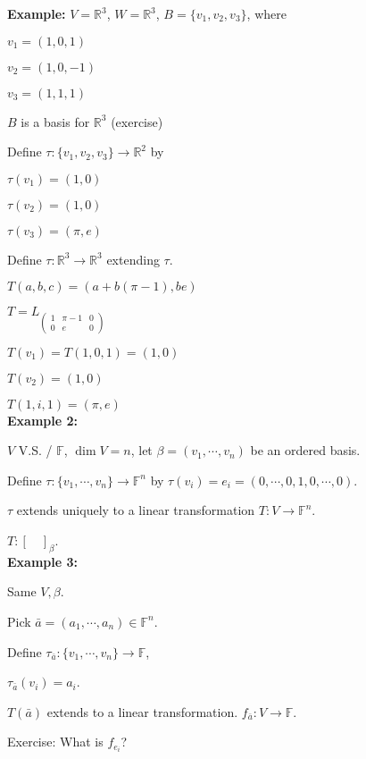 \documentclass[12pt]{article}
\newcommand{\mR}{{\mathbb{R}}}
\newcommand{\mF}{{\mathbb{F}}}
\begin{document}
	{\color{Brown}
	\textbf{Example: }
	$V = \mR^3$, $W = \mR^3$, $B = \{v_1, v_2, v_3\}$, where 
	\begin{description}
		\item $v_1 = (1, 0, 1)$
		\item $v_2 = (1, 0, -1)$
		\item $v_3 = (1, 1, 1)$
	\end{description}

	$B$ is a basis for $\mR^3$ (exercise)

	Define $\tau :\{v_1, v_2,v_3\} \to \mR^2$ by 
	\begin{description}
		\item $\tau(v_1) = (1, 0)$
		\item $\tau(v_2) = (1, 0)$
		\item $\tau(v_3) = (\pi, e)$
	\end{description}
	Define $\tau: \mR^3 \to \mR^3$ extending $\tau$. 

	$T(a,b,c) = (a + b(\pi-1), be)$ 

	$T = L_{\begin{pmatrix}
			1 & \pi-1 & 0\\
			0 & e & 0
	\end{pmatrix}}$

	$T(v_1) = T(1, 0, 1) = (1, 0)$

	$T(v_2) = (1, 0)$ 
	
	$T(1, i , 1) = (\pi, e)$ \\
	
	\textbf{Example 2: }

	$V$ V.S. / $\mF$, $\dim V= n$, let $\beta = (v_1, \cdots, v_n)$ be an 
	ordered basis. 

	Define $\tau : \{v_1, \cdots, v_n\} \to \mF^n$ by $\tau(v_i) = 
	e_i = (0, \cdots, 0, 1, 0, \cdots, 0)$. 

	$\tau$ extends uniquely to a linear transformation $T : V \to \mF^n$. 

	$T : [\quad ]_{\beta}$. \\

	\textbf{Example 3: }

	Same $V, \beta$. 

	Pick $\bar{a} = (a_1, \cdots, a_n) \in \mF^n$. 

	Define $\tau_{\bar{a}} : \{v_1, \cdots, v_n\} \to \mF$, 

	$\tau_{\bar {a}}(v_i) = a_i$. 

	$T(\bar a)$ extends to a linear transformation. $f_{\bar a} : V\to \mF$.

	Exercise: What is $f_{e_i}$? 

	}
\end{document}
